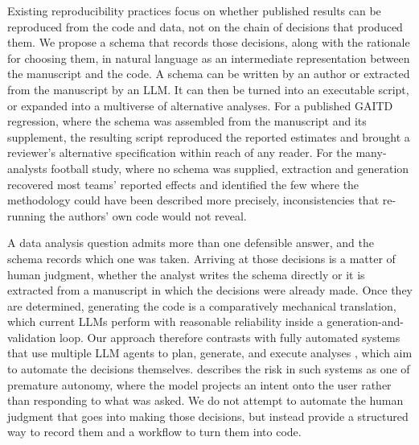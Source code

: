 \documentclass[aoas]{imsart}
\begin{document}
Existing reproducibility practices focus on whether published results
can be reproduced from the code and data, not on the chain of decisions
that produced them. We propose a schema that records those decisions,
along with the rationale for choosing them, in natural language as an
intermediate representation between the manuscript and the code. A
schema can be written by an author or extracted from the manuscript by
an LLM. It can then be turned into an executable script, or expanded
into a multiverse of alternative analyses. For a published GAITD
regression, where the schema was assembled from the manuscript and its
supplement, the resulting script reproduced the reported estimates and
brought a reviewer's alternative specification within reach of any
reader. For the many-analysts football study, where no schema was
supplied, extraction and generation recovered most teams' reported
effects and identified the few where the methodology could have been
described more precisely, inconsistencies that re-running the authors'
own code would not reveal.

A data analysis question admits more than one defensible answer, and the
schema records which one was taken. Arriving at those decisions is a
matter of human judgment, whether the analyst writes the schema directly
or it is extracted from a manuscript in which the decisions were already
made. Once they are determined, generating the code is a comparatively
mechanical translation, which current LLMs perform with reasonable
reliability inside a generation-and-validation loop. Our approach
therefore contrasts with fully automated systems that use multiple LLM
agents to plan, generate, and execute analyses
\citep{jansen2025, hu_automated_2024, sun_lambda_2026}, which aim to
automate the decisions themselves. \citet{donoho2026} describes the risk
in such systems as one of premature autonomy, where the model projects
an intent onto the user rather than responding to what was asked. We do
not attempt to automate the human judgment that goes into making those
decisions, but instead provide a structured way to record them and a
workflow to turn them into code.
\end{document}
